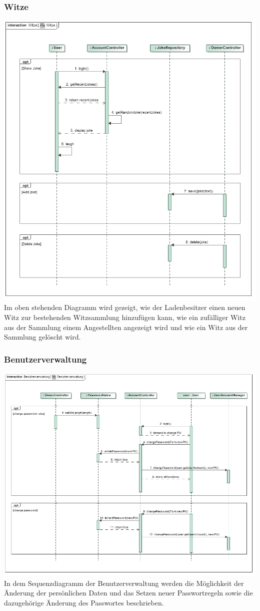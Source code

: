 \documentclass[pdftex,12pt,a4paper]{article}
\begin{document}
\subsubsection*{Witze}
\includegraphics[width=1\textwidth]{../../Entwurf/witze_ood}
Im oben stehenden Diagramm wird gezeigt, wie der Ladenbesitzer einen neuen Witz zur bestehenden Witzsammlung hinzufügen kann, wie ein zufälliger Witz aus der Sammlung einem Angestellten angezeigt wird und wie ein Witz aus der Sammlung gelöscht wird.
\subsubsection*{Benutzerverwaltung}
\includegraphics[width=1\textwidth]{../../Entwurf/benutzerverwaltung_ood}
In dem Sequenzdiagramm der Benutzerverwaltung werden die M\"oglichkeit der \"Anderung der pers\"onlichen Daten und das Setzen neuer Passwortregeln sowie die dazugeh\"orige \"Anderung des Passwortes beschrieben.
\end{document}
